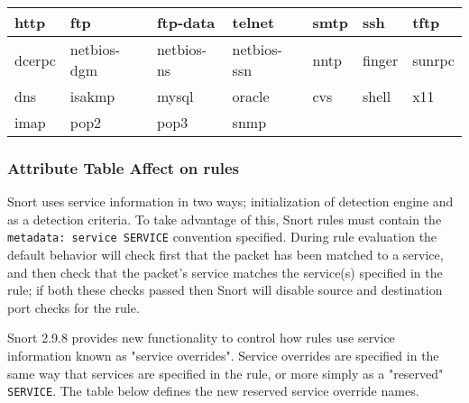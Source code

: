 \documentclass[english]{report}
\begin{document}
\begin{table}[h]
\label{attribute:service names}
\begin{center}
\begin{tabular}{| l | l | l | l | l | l | l |}
\hline 
http & ftp & ftp-data & telnet & smtp & ssh & tftp \\
\hline 
dcerpc & netbios-dgm & netbios-ns & netbios-ssn & nntp & finger & sunrpc \\
\hline 
dns & isakmp & mysql & oracle & cvs & shell & x11 \\
\hline 
imap & pop2 & pop3 & snmp & & & \\
\hline 
\end{tabular}
\end{center}
\end{table}

\subsubsection{Attribute Table Affect on rules}

Snort uses service information in two ways; initialization of detection engine 
and as a detection criteria. To take advantage of this, Snort rules must
contain the \texttt{metadata: service SERVICE} convention specified. During rule 
evaluation the default behavior will check first that the packet has been matched
to a service, and then check that the packet's service matches the service(s)
specified in the rule; if both these checks passed then Snort will disable
source and destination port checks for the rule.

Snort 2.9.8 provides new functionality to control how rules use service
information known as "service overrides". Service overrides are specified in
the same way that services are specified in the rule, or more simply as a
"reserved" \texttt{SERVICE}. The table below defines the new reserved service
override names.
\end{document}
